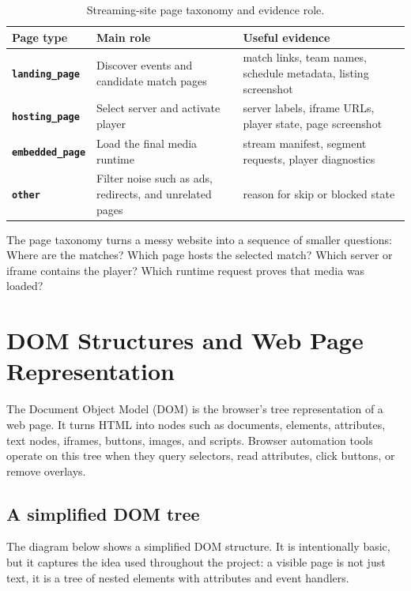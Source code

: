 \begin{table}[!htbp]
\centering
\begin{tabularx}{\textwidth}{>{\raggedright\arraybackslash\bfseries}p{3.2cm}
                              >{\raggedright\arraybackslash}X
                              >{\raggedright\arraybackslash}X}
\toprule
\rowcolor{accent!8}
Page type & Main role & Useful evidence \\ \midrule
\texttt{landing\_page} & Discover events and candidate match pages & match links,
team names, schedule metadata, listing screenshot \\
\texttt{hosting\_page} & Select server and activate player & server labels, iframe
URLs, player state, page screenshot \\
\texttt{embedded\_page} & Load the final media runtime & stream manifest, segment
requests, player diagnostics \\
\texttt{other} & Filter noise such as ads, redirects, and unrelated pages & reason for
skip or blocked state \\
\bottomrule
\end{tabularx}
\caption{Streaming-site page taxonomy and evidence role.}\label{tab:general-page-taxonomy}
\end{table}

The page taxonomy turns a messy website into a sequence of smaller questions: Where are
the matches? Which page hosts the selected match? Which server or iframe contains the
player? Which runtime request proves that media was loaded?

\section{DOM Structures and Web Page Representation}

The Document Object Model (DOM) is the browser's tree representation of a web page. It
turns HTML into nodes such as documents, elements, attributes, text nodes, iframes,
buttons, images, and scripts. Browser automation tools operate on this tree when they
query selectors, read attributes, click buttons, or remove overlays.

\subsection{A simplified DOM tree}

The diagram below shows a simplified DOM structure. It is intentionally basic, but it
captures the idea used throughout the project: a visible page is not just text, it is a
tree of nested elements with attributes and event handlers.

